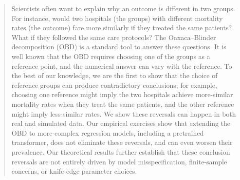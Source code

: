\documentclass[twoside]{article}
\theoremstyle{definition}
\begin{document}

\begin{abstract}
Scientists often want to explain why an outcome is different in two groups. For instance, would two hospitals (the groups) with different mortality rates (the outcome) fare more similarly if they treated the same patients? What if they followed the same care protocols? The Oaxaca--Blinder decomposition (OBD) is a standard tool to answer these questions. It is well known that the OBD requires choosing one of the groups as a reference point, and the numerical answer can vary with the reference. To the best of our knowledge, we are the first to show that the choice of reference groups can produce contradictory conclusions; for example, choosing one reference might imply the two hospitals achieve more-similar mortality rates when they treat the same patients, and the other reference might imply less-similar rates. We show these reversals can happen in both real and simulated data. Our empirical exercises show that extending the OBD to more-complex regression models, including a pretrained transformer, does not eliminate these reversals, and can even worsen their prevalence. Our theoretical results further establish that these conclusion reversals are not entirely driven by model misspecification, finite-sample concerns, or knife-edge parameter choices.
\end{abstract}
\end{document}
